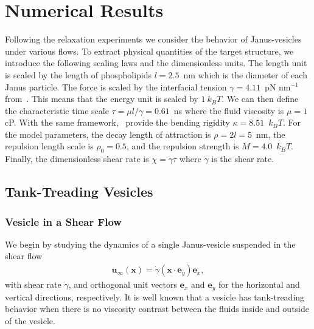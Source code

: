 \documentclass[lineno]{jfm}
\newcommand{\xx}{\mathbf{x}}
\newcommand{\uu}{\mathbf{u}}
\begin{document}
\section{\label{results}Numerical Results}


Following the relaxation experiments we consider the behavior of
Janus-vesicles under various flows. To extract physical quantities of
the target structure, we introduce the following scaling laws and the
dimensionless units. The length unit is scaled by the length of
phospholipids $l=2.5$~nm which is the diameter of each Janus particle.
The force is scaled by the interfacial tension $\gamma=4.11$~pN
nm$^{-1}$ from~\cite{Ryham16}. This means that the energy unit is scaled
by $1\ k_BT$. We can then define the characteristic time scale $\tau =
\mu l/\gamma = 0.61$~ns where the fluid viscosity is $\mu=1$ cP.  With
the same framework,~\cite{Fu20} provide the bending rigidity
$\kappa=8.51$~$k_BT$. For the model parameters, the decay length of
attraction is $\rho = 2l = 5$~nm, the repulsion length scale is
$\rho_0=0.5$, and the repulsion strength is $M=4.0$~$k_BT$. Finally, the
dimensionless shear rate is $\chi = \dot\gamma \tau$ where $\dot\gamma$
is the shear rate.





\subsection{Tank-Treading Vesicles}

\subsubsection{Vesicle in a Shear Flow}
\label{sec:ves_in_shear}
We begin by studying the dynamics of a single Janus-vesicle suspended in
the shear flow
\begin{align}
  \uu_{\infty}(\xx) = \dot\gamma (\xx \cdot \mathbf{e}_y) \mathbf{e}_x,
\end{align}
with shear rate $\dot\gamma$, and orthogonal unit vectors $\mathbf{e}_x$
and $\mathbf{e}_y$ for the horizontal and vertical directions,
respectively. It is well known that a vesicle has tank-treading behavior
when there is no viscosity contrast between the fluids inside and
outside of the vesicle.
\end{document}
